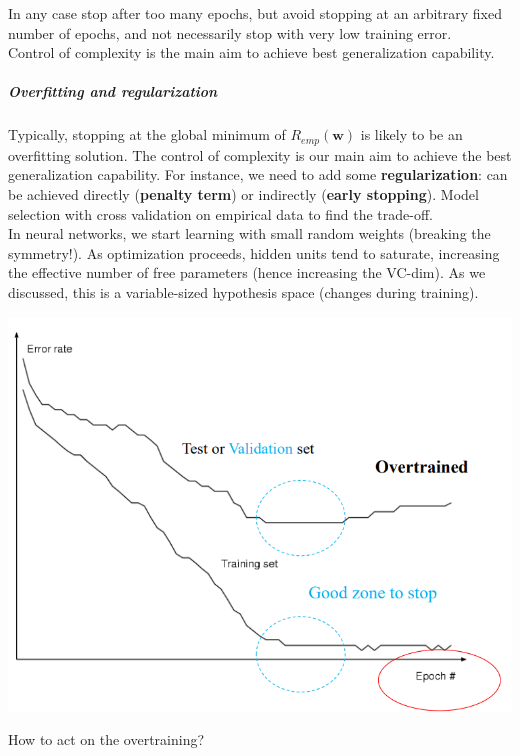 \documentclass[10pt]{report}
\begin{document}
In any case stop after too many epochs, but avoid stopping at an arbitrary fixed number of epochs, and not necessarily stop with very low training error.\\
Control of complexity is the main aim to achieve best generalization capability.
\subparagraph{Overfitting and regularization} Typically, stopping at the global minimum of $R_{emp}(\mathbf{w})$ is likely to be an overfitting solution. The control of complexity is our main aim to achieve the best generalization capability. For instance, we need to add some \textbf{regularization}: can be achieved directly (\textbf{penalty term}) or indirectly (\textbf{early stopping}). Model selection with cross validation on empirical data to find the trade-off.\\
In neural networks, we start learning with small random weights (breaking the symmetry!). As optimization proceeds, hidden units tend to saturate, increasing the effective number of free parameters (hence increasing the VC-dim). As we discussed, this is a variable-sized hypothesis space (changes during training).
\begin{center}
	\includegraphics[scale=0.5]{8.png}
\end{center}
How to act on the overtraining?
\end{document}
